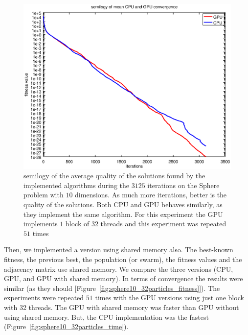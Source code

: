 \documentclass{article}
\begin{document}
    \begin{figure}[!htb]
        \centering
        \includegraphics[width=.7\textwidth]{../img/semilogy_convergence.eps}
        \caption{semilogy of the average quality of the solutions found by the implemented algorithms during the $3125$ iterations on the Sphere problem with $10$ dimensions. As much more iterations, better is the quality of the solutions. Both CPU and GPU behaves similarly, as they implement the same algorithm. For this experiment the GPU implements $1$ block of $32$ threads and this experiment was repeated $51$ times}
        \label{fig:semilogy_convergence}
    \end{figure}

    Then, we implemented a version using shared memory also.
    The best-known fitness, the previous best, the population (or swarm), the fitness values and the adjacency matrix use shared memory.
    We compare the three versions (CPU, GPU, and GPU with shared memory). In terms of convergence the results were similar (as they should [Figure~\ref{fig:sphere10_32particles_fitness}]).
    The experiments were repeated $51$ times with the GPU versions using just one block with 32 threads. The GPU with shared memory was faster than GPU without using shared memory. But, the CPU implementation was the fastest (Figure~\ref{fig:sphere10_32particles_time}).
\end{document}
